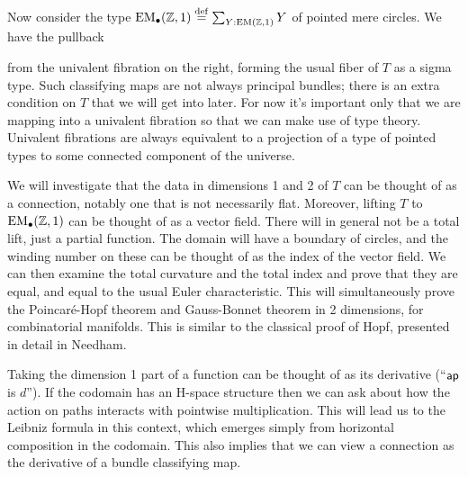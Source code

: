 Now consider the type \( \mathrm{EM_{\bullet}}(\mathbb{Z},1)\stackrel{\mathrm{def}}{=} \sum_{Y:\mathrm{EM}(\mathbb{Z},1)}Y \) of pointed mere circles. We have the pullback
\begin{center}
\end{center}
from the univalent fibration on the right, forming the usual fiber of \( T \) as a sigma type. Such classifying maps are not always principal bundles; there is an extra condition on \( T \) that we will get into later. For now it's important only that we are mapping into a univalent fibration so that we can make use of type theory. Univalent fibrations are always equivalent to a projection of a type of pointed types to some connected component of the universe\cite{christensen_univalence}.

We will investigate that the data in dimensions 1 and 2 of \( T \) can be thought of as a connection, notably one that is not necessarily flat. Moreover, lifting \( T \) to \( \mathrm{EM_{\bullet}}(\mathbb{Z},1) \) can be thought of as a vector field. There will in general not be a total lift, just a partial function. The domain will have a boundary of circles, and the winding number on these can be thought of as the index of the vector field. We can then examine the total curvature and the total index and prove that they are equal, and equal to the usual Euler characteristic. This will simultaneously prove the Poincaré-Hopf theorem and Gauss-Bonnet theorem in 2 dimensions, for combinatorial manifolds. This is similar to the classical proof of Hopf\cite{hopf}, presented in detail in Needham\cite{needham}.

Taking the dimension 1 part of a function can be thought of as its derivative (``\( \mathsf{ap} \) is \( d \)''). If the codomain has an H-space structure then we can ask about how the action on paths interacts with pointwise multiplication. This will lead us to the Leibniz formula in this context, which emerges simply from horizontal composition in the codomain. This also implies that we can view a connection as the derivative of a bundle classifying map.

